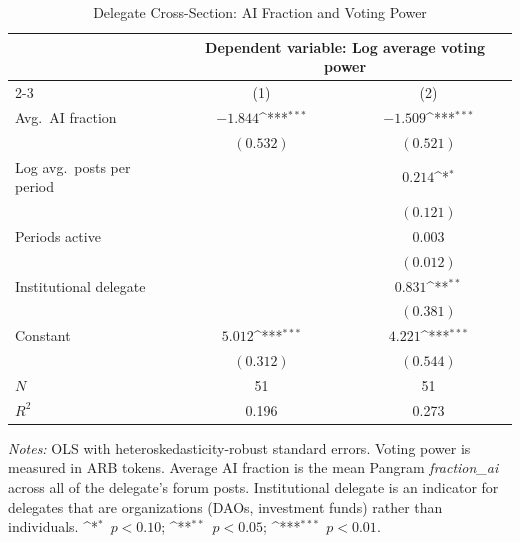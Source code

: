 \documentclass[12pt]{article}
\newcommand{\FloatBarrier}{\par}
\newcommand{\sym}[1]{\ifmmode^{#1}\else\(^{#1}\)\fi}
\begin{document}
\begin{table}[H]
\centering
\caption{Delegate Cross-Section: AI Fraction and Voting Power}
\label{tab:delegate_cross}
\begin{singlespace}
\begin{tabular}{lcc}
\toprule
 & \multicolumn{2}{c}{Dependent variable: Log average voting power} \\
\cmidrule(lr){2-3}
 & \multicolumn{1}{c}{(1)} & \multicolumn{1}{c}{(2)} \\
\midrule
Avg.\ AI fraction          & $-1.844$\sym{***} & $-1.509$\sym{***} \\
                           & $(0.532)$         & $(0.521)$         \\
Log avg.\ posts per period &                   & $0.214$\sym{*}    \\
                           &                   & $(0.121)$         \\
Periods active             &                   & $0.003$           \\
                           &                   & $(0.012)$         \\
Institutional delegate     &                   & $0.831$\sym{**}   \\
                           &                   & $(0.381)$         \\
Constant                   & $5.012$\sym{***}  & $4.221$\sym{***}  \\
                           & $(0.312)$         & $(0.544)$         \\
\midrule
$N$                        & 51                & 51                \\
$R^2$                      & 0.196             & 0.273             \\
\bottomrule
\end{tabular}
\begin{flushleft}
\small\textit{Notes:} OLS with heteroskedasticity-robust standard errors. Voting power
is measured in ARB tokens. Average AI fraction is the mean Pangram \textit{fraction\_ai}
across all of the delegate's forum posts. Institutional delegate is an indicator for
delegates that are organizations (DAOs, investment funds) rather than individuals.
\sym{*}~$p < 0.10$; \sym{**}~$p < 0.05$; \sym{***}~$p < 0.01$.
\end{flushleft}
\end{singlespace}
\end{table}

\FloatBarrier
\end{document}
